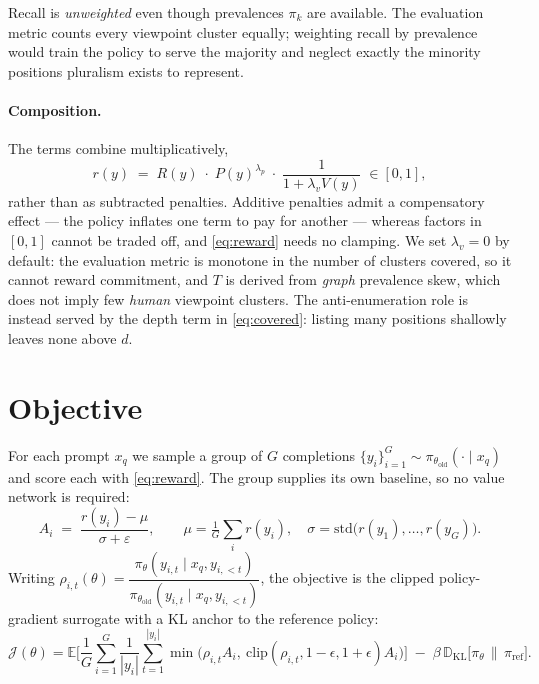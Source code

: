 \documentclass[11pt]{article}
\newcommand{\pol}{\pi_\theta}
\newcommand{\polold}{\pi_{\theta_{\mathrm{old}}}}
\newcommand{\polref}{\pi_{\mathrm{ref}}}
\begin{document}
Recall is \emph{unweighted} even though prevalences $\pi_k$ are available. The
evaluation metric counts every viewpoint cluster equally; weighting recall by
prevalence would train the policy to serve the majority and neglect exactly the
minority positions pluralism exists to represent.

\paragraph{Composition.} The terms combine multiplicatively,
\begin{equation}\label{eq:reward}
  r(y)\;=\;R(y)\;\cdot\;P(y)^{\lambda_p}\;\cdot\;\frac{1}{1+\lambda_v V(y)}
  \;\in[0,1],
\end{equation}
rather than as subtracted penalties. Additive penalties admit a compensatory
effect --- the policy inflates one term to pay for another --- whereas factors in
$[0,1]$ cannot be traded off, and \eqref{eq:reward} needs no clamping.
We set $\lambda_v=0$ by default: the evaluation metric is monotone in the number
of clusters covered, so it cannot reward commitment, and $T$ is derived from
\emph{graph} prevalence skew, which does not imply few \emph{human} viewpoint
clusters. The anti-enumeration role is instead served by the depth term in
\eqref{eq:covered}: listing many positions shallowly leaves none above $d$.

\section{Objective}

For each prompt $x_q$ we sample a group of $G$ completions
$\{y_i\}_{i=1}^{G}\sim\polold(\cdot\mid x_q)$ and score each with
\eqref{eq:reward}. The group supplies its own baseline, so no value network is
required:
\begin{equation}\label{eq:adv}
  A_i \;=\; \frac{r(y_i)-\mu}{\sigma+\varepsilon},
  \qquad
  \mu=\tfrac{1}{G}\textstyle\sum_i r(y_i),\quad
  \sigma=\mathrm{std}\big(r(y_1),\dots,r(y_G)\big).
\end{equation}
Writing $\rho_{i,t}(\theta)=\dfrac{\pol(y_{i,t}\mid x_q,y_{i,<t})}
{\polold(y_{i,t}\mid x_q,y_{i,<t})}$, the objective is the clipped
policy-gradient surrogate with a KL anchor to the reference policy:
\begin{equation}\label{eq:grpo}
  \mathcal{J}(\theta)=
  \mathbb{E}\Bigg[\frac{1}{G}\sum_{i=1}^{G}\frac{1}{|y_i|}\sum_{t=1}^{|y_i|}
  \min\Big(\rho_{i,t}A_i,\ \mathrm{clip}(\rho_{i,t},1-\epsilon,1+\epsilon)A_i\Big)
  \Bigg]
  \;-\;\beta\,\mathbb{D}_{\mathrm{KL}}\!\big[\pol \,\|\, \polref\big].
\end{equation}
\end{document}
